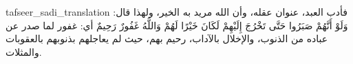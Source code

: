 \begin{taggedblock}{tafseer_sadi_translation}
فأدب العبد، عنوان عقله، وأن الله مريد به الخير، ولهذا قال:
{ وَلَوْ أَنَّهُمْ صَبَرُوا حَتَّى تَخْرُجَ إِلَيْهِمْ لَكَانَ خَيْرًا لَهُمْ وَاللَّهُ غَفُورٌ رَحِيمٌ }
أي: غفور لما صدر عن عباده من الذنوب، والإخلال بالآداب، رحيم بهم، حيث لم يعاجلهم بذنوبهم بالعقوبات والمثلات.
\end{taggedblock}

\begin{comment}
Please use the following for footnotes:- Sample\footnoteQ{Text of Qur'an footnote goes here.}.
Sample\footnoteT{Text of Tafseer footnote goes here.}.
\end{comment}